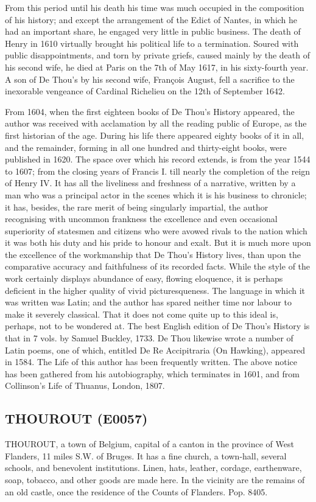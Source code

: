 \documentclass{article}
\begin{document}
From this period until his death his time was much occupied in the composition of his history; and except the arrangement of the Edict of Nantes, in which he had an important share, he engaged very little in public business. The death of Henry in 1610 virtually brought his political life to a termination. Soured with public disappointments, and torn by private griefs, caused mainly by the death of his second wife, he died at Paris on the 7th of May 1617, in his sixty-fourth year. A son of De Thou's by his second wife, François August, fell a sacrifice to the inexorable vengeance of Cardinal Richelieu on the 12th of September 1642.

From 1604, when the first eighteen books of De Thou's History appeared, the author was received with acclamation by all the reading public of Europe, as the first historian of the age. During his life there appeared eighty books of it in all, and the remainder, forming in all one hundred and thirty-eight books, were published in 1620. The space over which his record extends, is from the year 1544 to 1607; from the closing years of Francis I. till nearly the completion of the reign of Henry IV. It has all the liveliness and freshness of a narrative, written by a man who was a principal actor in the scenes which it is his business to chronicle; it has, besides, the rare merit of being singularly impartial, the author recognising with uncommon frankness the excellence and even occasional superiority of statesmen and citizens who were avowed rivals to the nation which it was both his duty and his pride to honour and exalt. But it is much more upon the excellence of the workmanship that De Thou's History lives, than upon the comparative accuracy and faithfulness of its recorded facts. While the style of the work certainly displays abundance of easy, flowing eloquence, it is perhaps deficient in the higher quality of vivid picturesqueness. The language in which it was written was Latin; and the author has spared neither time nor labour to make it severely classical. That it does not come quite up to this ideal is, perhaps, not to be wondered at. The best English edition of De Thou's History is that in 7 vols. by Samuel Buckley, 1733. De Thou likewise wrote a number of Latin poems, one of which, entitled De Re Accipitraria (On Hawking), appeared in 1584. The Life of this author has been frequently written. The above notice has been gathered from his autobiography, which terminates in 1601, and from Collinson's Life of Thuanus, London, 1807.

\subsection*{THOUROUT (E0057)}
THOUROUT, a town of Belgium, capital of a canton in the province of West Flanders, 11 miles S.W. of Bruges. It has a fine church, a town-hall, several schools, and benevolent institutions. Linen, hats, leather, cordage, earthenware, soap, tobacco, and other goods are made here. In the vicinity are the remains of an old castle, once the residence of the Counts of Flanders. Pop. 8405.
\end{document}
